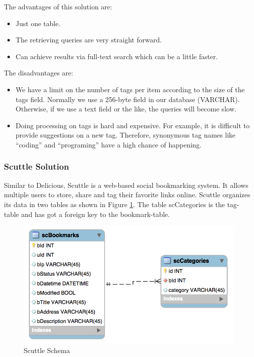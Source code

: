 The advantages of this solution are:
\begin{itemize}
   \item Just one table.
   \item The retrieving queries are very straight forward.
   \item Can achieve results via full-text search which can be a little faster.
\end{itemize}

The disadvantages are:
\begin{itemize}
   \item We have a limit on the number of tags per item according to the size of the tags field. Normally we use a 256-byte field in our database (VARCHAR). Otherwise, if we use a text field or the like, the queries will become slow.
   \item Doing processing on tags is hard and expensive. For example, it is difficult to provide suggestions on a new tag. Therefore, synonymous tag names like ``coding'' and ``programing'' have a high chance of happening.
\end{itemize}

\subsubsection{Scuttle Solution}
Similar to Delicious, Scuttle \cite{scuttle} is a web-based social bookmarking system. It allows multiple users to store, share and tag their favorite links online. Scuttle organizes its data in two tables as shown in Figure \ref{fg:scuttle}. The table scCategories is the tag-table and has got a foreign key to the bookmark-table.

\begin{figure}[!h]
\begin{centering}
\includegraphics[scale=0.5]{pics/scuttle}
\caption{Scuttle Schema}\label{fg:scuttle}
\end{centering}
\end{figure}


